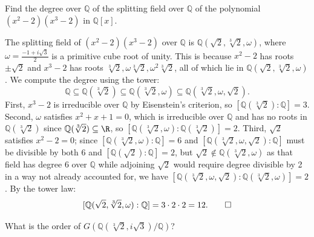 \begin{problem}[44.6]
  Find the degree over $\mathbb{Q}$ of the splitting field over $\mathbb{Q}$ of the polynomial $(x^2 - 2)(x^3 - 2)$ in $\mathbb{Q}[x]$.
\end{problem}

\begin{solution}
  The splitting field of $(x^2 - 2)(x^3 - 2)$ over $\mathbb{Q}$ is $\mathbb{Q}(\sqrt{2}, \sqrt[3]{2}, \omega)$, where $\omega = \frac{-1 + i\sqrt{3}}{2}$ is a primitive cube root of unity. This is because $x^2 - 2$ has roots $\pm\sqrt{2}$ and $x^3 - 2$ has roots $\sqrt[3]{2}, \omega\sqrt[3]{2}, \omega^2\sqrt[3]{2}$, all of which lie in $\mathbb{Q}(\sqrt{2}, \sqrt[3]{2}, \omega)$. We compute the degree using the tower:
  \[%
    \mathbb{Q} \subseteq \mathbb{Q}(\sqrt[3]{2}) \subseteq \mathbb{Q}(\sqrt[3]{2}, \omega) \subseteq \mathbb{Q}(\sqrt[3]{2}, \omega, \sqrt{2})
  .\]%
  First, $x^3 - 2$ is irreducible over $\mathbb{Q}$ by Eisenstein's criterion, so $[\mathbb{Q}(\sqrt[3]{2}) : \mathbb{Q}] = 3$. Second, $\omega$ satisfies $x^2 + x + 1 = 0$, which is irreducible over $\mathbb{Q}$ and has no roots in $\mathbb{Q}(\sqrt[3]{2})$ since $\mathbb{Q}(\sqrt[3]{2}) \subseteq \R$, so $[\mathbb{Q}(\sqrt[3]{2}, \omega) : \mathbb{Q}(\sqrt[3]{2})] = 2$. Third, $\sqrt{2}$ satisfies $x^2 - 2 = 0$; since $[\mathbb{Q}(\sqrt[3]{2}, \omega) : \mathbb{Q}] = 6$ and $[\mathbb{Q}(\sqrt[3]{2}, \omega, \sqrt{2}) : \mathbb{Q}]$ must be divisible by both $6$ and $[\mathbb{Q}(\sqrt{2}) : \mathbb{Q}] = 2$, but $\sqrt{2} \notin \mathbb{Q}(\sqrt[3]{2}, \omega)$ as that field has degree 6 over $\mathbb{Q}$ while adjoining $\sqrt{2}$ would require degree divisible by 2 in a way not already accounted for, we have $[\mathbb{Q}(\sqrt[3]{2}, \omega, \sqrt{2}) : \mathbb{Q}(\sqrt[3]{2}, \omega)] = 2$. By the tower law:
  \[%
    [\mathbb{Q}(\sqrt{2}, \sqrt[3]{2}, \omega) : \mathbb{Q}] = 3 \cdot 2 \cdot 2 = 12
  .\qedhere\]%
\end{solution}

\begin{problem}[44.8]
  What is the order of $G(\mathbb{Q}(\sqrt[3]{2}, i\sqrt{3})/\mathbb{Q})$?
\end{problem}

